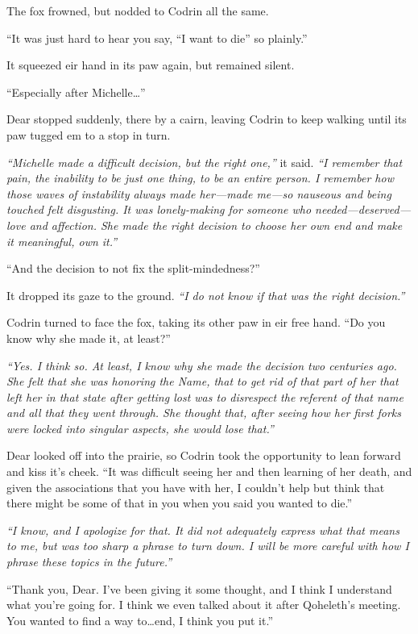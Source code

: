 The fox frowned, but nodded to Codrin all the same.

``It was just hard to hear you say, ``I want to die'' so plainly.''

It squeezed eir hand in its paw again, but remained silent.

``Especially after Michelle\ldots{}''

Dear stopped suddenly, there by a cairn, leaving Codrin to keep walking until its paw tugged em to a stop in turn.

\emph{``Michelle made a difficult decision, but the right one,''} it said. \emph{``I remember that pain, the inability to be just one thing, to be an entire person. I remember how those waves of instability always made her---made me---so nauseous and being touched felt disgusting. It was lonely-making for someone who needed---deserved---love and affection. She made the right decision to choose her own end and make it meaningful, own it.''}

``And the decision to not fix the split-mindedness?''

It dropped its gaze to the ground. \emph{``I do not know if that was the right decision.''}

Codrin turned to face the fox, taking its other paw in eir free hand. ``Do you know why she made it, at least?''

\emph{``Yes. I think so. At least, I know why she made the decision two centuries ago. She felt that she was honoring the Name, that to get rid of that part of her that left her in that state after getting lost was to disrespect the referent of that name and all that they went through. She thought that, after seeing how her first forks were locked into singular aspects, she would lose that.''}

Dear looked off into the prairie, so Codrin took the opportunity to lean forward and kiss it's cheek. ``It was difficult seeing her and then learning of her death, and given the associations that you have with her, I couldn't help but think that there might be some of that in you when you said you wanted to die.''

\emph{``I know, and I apologize for that. It did not adequately express what that means to me, but was too sharp a phrase to turn down. I will be more careful with how I phrase these topics in the future.''}

``Thank you, Dear. I've been giving it some thought, and I think I understand what you're going for. I think we even talked about it after Qoheleth's meeting. You wanted to find a way to\ldots end, I think you put it.''

